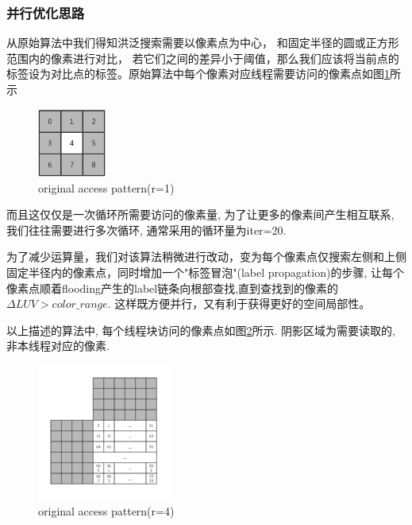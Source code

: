 \documentclass[a4paper, 11pt]{article}
\begin{document}
\subsubsection{并行优化思路}
从原始算法中我们得知洪泛搜索需要以像素点为中心，
和固定半径的圆或正方形范围内的像素进行对比，
若它们之间的差异小于阈值，那么我们应该将当前点的标签设为对比点的标签。原始算法中每个像素对应线程需要访问的像素点如图\ref{fig:cuda_fl_1}所示

\begin{figure}[H]    
	\centering
	\includegraphics[width=0.2\textwidth]{images/cuda_fl/1}
	\caption{original access pattern(r=1)}
	\label{fig:cuda_fl_1}
\end{figure}

而且这仅仅是一次循环所需要访问的像素量, 为了让更多的像素间产生相互联系, 我们往往需要进行多次循环, 通常采用的循环量为iter=20.

为了减少运算量，我们对该算法稍微进行改动，变为每个像素点仅搜索左侧和上侧固定半径内的像素点，同时增加一个"标签冒泡"(label propagation)的步骤, 让每个像素点顺着flooding产生的label链条向根部查找,直到查找到的像素的$\Delta LUV > color\_range$. 这样既方便并行，又有利于获得更好的空间局部性。

以上描述的算法中, 每个线程块访问的像素点如图\ref{fig:cuda_fl_2}所示. 阴影区域为需要读取的, 非本线程对应的像素.

\begin{figure}[H]    
	\centering
	\includegraphics[width=0.4\textwidth]{images/cuda_fl/2}
	\caption{original access pattern(r=4)}
	\label{fig:cuda_fl_2}
\end{figure}
\end{document}
